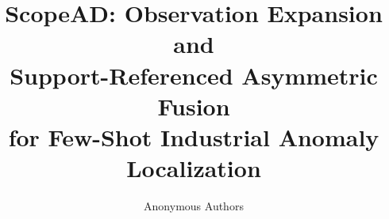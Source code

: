 \documentclass[10pt,twocolumn,letterpaper]{article}
\title{ScopeAD: Observation Expansion and\\
Support-Referenced Asymmetric Fusion\\
for Few-Shot Industrial Anomaly Localization}
\author{Anonymous Authors}
\begin{document}
\maketitle







{\small

}
\clearpage
\appendix
% 
\end{document}
